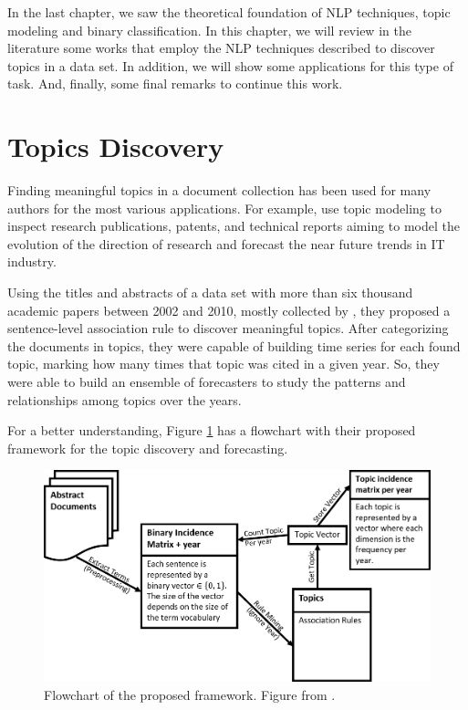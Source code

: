 In the last chapter, we saw the theoretical foundation of NLP techniques, topic modeling and binary classification. In this chapter, we will review in the literature some works that employ the NLP techniques described to discover topics in a data set. In addition, we will show some applications for this type of task. And, finally, some final remarks to continue this work.


\section{Topics Discovery}

Finding meaningful topics in a document collection has been used for many authors for the most various applications. For example,  use topic modeling to inspect research publications, patents, and technical reports aiming to model the evolution of the direction of research and forecast the near future trends in IT industry.

Using the titles and abstracts of a data set with more than six thousand academic papers between 2002 and 2010, mostly collected by , they proposed a sentence-level association rule to discover meaningful topics. After categorizing the documents in topics, they were capable of building time series for each found topic, marking how many times that topic was cited in a given year. So, they were able to build an ensemble of forecasters to study the patterns and relationships among topics over the years.

For a better understanding, Figure \ref{fig:topic-discovery-framework} has a flowchart with their proposed framework for the topic discovery and forecasting.

\begin{figure}[h!]
	\centering
	\includegraphics[width=0.85\linewidth]{01.Chapters/03.RelatedWorks/topic-discovery-framework}
	\caption{Flowchart of the proposed framework. Figure from  .}
	\label{fig:topic-discovery-framework}
\end{figure}

